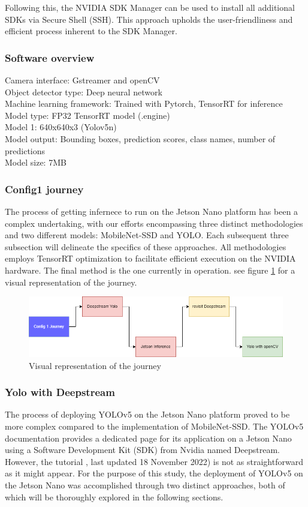 Following this, the NVIDIA SDK Manager can be used to install all additional SDKs via Secure Shell (SSH). This approach upholds the user-friendliness and efficient process inherent to the SDK Manager.

\subsubsection{Software overview}
Camera interface: Gstreamer and openCV\\
Object detector type: Deep neural network\\
Machine learning framework: Trained with Pytorch, TensorRT for inference\\
Model type: FP32 TensorRT model (.engine)\\
Model 1: 640x640x3 (Yolov5n)\\
Model output: Bounding boxes, prediction scores, class names, number of predictions\\
Model size: 7MB

\subsubsection{Config1 journey}


The process of getting infernece to run on the Jetson Nano platform has been a complex undertaking, with our efforts encompassing three distinct methodologies and two different models: MobileNet-SSD and YOLO. Each subsequent three subsection will delineate the specifics of these approaches. All methodologies employs TensorRT optimization to facilitate efficient execution on the NVIDIA hardware. The final method is the one currently in operation. see figure \ref{fig:storyline} for a visual representation of the journey.

\begin{figure}[H]
    \centering
    \includegraphics[scale=0.5]{evenbilder/storyline.drawio.png}
    \caption{Visual representation of the journey}
    \label{fig:storyline}
\end{figure}

\subsubsection{Yolo with Deepstream}
The process of deploying YOLOv5 on the Jetson Nano platform proved to be more complex compared to the implementation of MobileNet-SSD. The YOLOv5 documentation provides a dedicated page for its application on a Jetson Nano using a Software Development Kit (SDK) from Nvidia named Deepstream. However, the tutorial \cite{yolo_on_jetson}, last updated 18 November 2022) is not as straightforward as it might appear. For the purpose of this study, the deployment of YOLOv5 on the Jetson Nano was accomplished through two distinct approaches, both of which will be thoroughly explored in the following sections.


